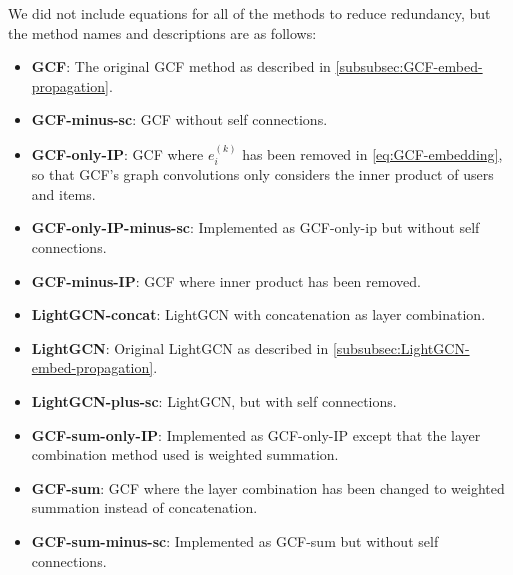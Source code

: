 We did not include equations for all of the methods to reduce redundancy, but the method names and descriptions are as follows:
\begin{itemize}
    \item \textbf{GCF}: The original GCF method as described in \autoref{subsubsec:GCF-embed-propagation}.
    \item \textbf{GCF-minus-sc}: GCF without self connections.
    \item \textbf{GCF-only-IP}:  GCF where $e_i^{(k)}$ has been removed in \autoref{eq:GCF-embedding}, so that GCF's graph convolutions only considers the inner product of users and items.
    \item \textbf{GCF-only-IP-minus-sc}: Implemented as GCF-only-ip but without self connections.
    \item \textbf{GCF-minus-IP}: GCF where inner product has been removed.
    \item \textbf{LightGCN-concat}: LightGCN with concatenation as layer combination.
    \item \textbf{LightGCN}: Original LightGCN as described in \autoref{subsubsec:LightGCN-embed-propagation}.
    \item \textbf{LightGCN-plus-sc}: LightGCN, but with self connections.
    \item \textbf{GCF-sum-only-IP}: Implemented as GCF-only-IP except that the layer combination method used is weighted summation.
    \item \textbf{GCF-sum}: GCF where the layer combination has been changed to weighted summation instead of concatenation.
    \item \textbf{GCF-sum-minus-sc}: Implemented as GCF-sum but without self connections.
\end{itemize}